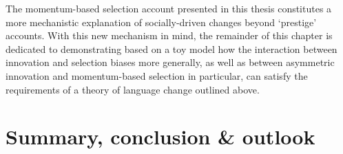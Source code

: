 The momentum-based selection account presented in this thesis constitutes a more mechanistic explanation of socially-driven changes beyond `prestige' accounts.
With this new mechanism in mind, the remainder of this chapter is dedicated to demonstrating based on a toy model how the interaction between innovation and selection biases more generally, as well as between asymmetric innovation and momentum-based selection in particular, can satisfy the requirements of a theory of language change outlined above.














\chapter{Summary, conclusion \& outlook}\label{ch:conclusion}

